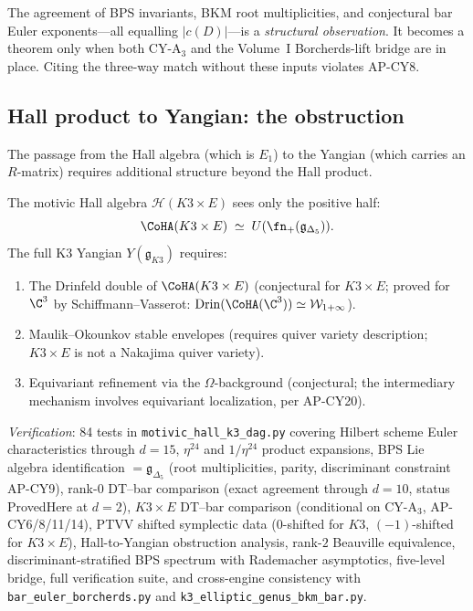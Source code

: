 \begin{warning}
\label{warn:k3e-bridge-observation}
The agreement of BPS invariants, BKM root multiplicities, and conjectural bar Euler exponents---all equalling $|c(D)|$---is a \emph{structural observation}.  It becomes a theorem only when both CY-A$_3$ and the Volume~I Borcherds-lift bridge are in place.  Citing the three-way match without these inputs violates AP-CY8.
\end{warning}

\subsection{Hall product to Yangian: the obstruction}
\label{subsec:k3e-hall-yangian-obstruction}

The passage from the Hall algebra (which is $E_1$) to the Yangian (which carries an $R$-matrix) requires additional structure beyond the Hall product.

\begin{proposition}
\label{prop:k3e-hall-yangian}
\ClaimStatusProvedHere
The motivic Hall algebra $\mathcal{H}(K3 \times E)$ sees only the positive half:
\[
  \CoHA(K3 \times E) \;\simeq\; U(\fn_+(\mathfrak{g}_{\Delta_5})).
\]
The full K3 Yangian $Y(\mathfrak{g}_{K3})$ requires:
\begin{enumerate}[label=(\alph*)]
  \item The Drinfeld double of $\CoHA(K3 \times E)$ \textup{(conjectural for $K3 \times E$; proved for $\C^3$ by Schiffmann--Vasserot: $\mathrm{Drin}(\CoHA(\C^3)) \simeq \mathcal{W}_{1+\infty}$)}.
  \item Maulik--Okounkov stable envelopes \textup{(requires quiver variety description; $K3 \times E$ is not a Nakajima quiver variety)}.
  \item Equivariant refinement via the $\Omega$-background \textup{(conjectural; the intermediary mechanism involves equivariant localization, per AP-CY20)}.
\end{enumerate}
\end{proposition}

\noindent\textit{Verification}: 84 tests in \texttt{motivic\_hall\_k3\_dag.py} covering Hilbert scheme Euler characteristics through $d = 15$, $\eta^{24}$ and $1/\eta^{24}$ product expansions, BPS Lie algebra identification $= \mathfrak{g}_{\Delta_5}$ (root multiplicities, parity, discriminant constraint AP-CY9), rank-$0$ DT--bar comparison (exact agreement through $d = 10$, status ProvedHere at $d = 2$), $K3 \times E$ DT--bar comparison (conditional on CY-A$_3$, AP-CY6/8/11/14), PTVV shifted symplectic data ($0$-shifted for $K3$, $(-1)$-shifted for $K3 \times E$), Hall-to-Yangian obstruction analysis, rank-$2$ Beauville equivalence, discriminant-stratified BPS spectrum with Rademacher asymptotics, five-level bridge, full verification suite, and cross-engine consistency with \texttt{bar\_euler\_borcherds.py} and \texttt{k3\_elliptic\_genus\_bkm\_bar.py}.


